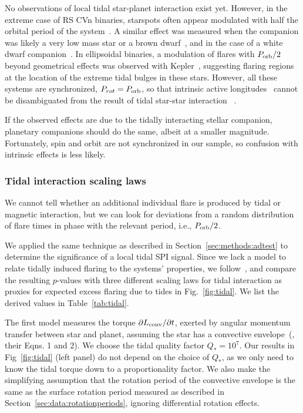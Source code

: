 \documentclass[twocolumn]{aastex631}
\begin{document}
No observations of local tidal star-planet interaction exist yet. However, in the extreme case of RS CVn binaries, starspots often appear modulated with half the orbital period of the system~\citep{olah2002time, ozavci2018recurrent, kriskovics2023ei}. A similar effect was measured when the companion was likely a very low mass star or a brown dwarf~\citep{donati1995activity, frasca2008spots, parks2021interferometric}, and in the case of a white dwarf companion~\citep{hussain2006spot, watson2007roche}. In ellipsoidal binaries, a modulation of flares with $P_{\rm orb}/2$ beyond geometrical effects was observed with Kepler~\citep{gao2016whitelight}, suggesting flaring regions at the location of the extreme tidal bulges in these stars. However, all these systems are synchronized, $P_{rot}=P_{\rm orb}$, so that intrinsic active longitudes~\citep{usoskin2007longterm, weber2013theory, jarvinen2005spots, lanza2009corot} cannot be disambiguated from the result of tidal star-star interaction ~\citep{holzwarth2003dynamics}. 

If the observed effects are due to the tidally interacting stellar companion, planetary companions should do the same, albeit at a smaller magnitude. Fortunately, spin and orbit are not synchronized in our sample, so confusion with intrinsic effects is less likely. 

\subsubsection{Tidal interaction scaling laws}

We cannot tell whether an additional individual flare is produced by tidal or magnetic interaction, but we can look for deviations from a random distribution of flare times in phase with the relevant period, i.e., $P_{\rm orb}/2$. 

We applied the same technique as described in Section~\ref{sec:methods:adtest} to determine the significance of a local tidal SPI signal. Since we lack a model to relate tidally induced flaring to the systems' properties, we follow~\citet{ilic2022tidal}, and compare the resulting $p$-values with three different scaling laws for tidal interaction as proxies for expected excess flaring due to tides in Fig.~\ref{fig:tidal}. We list the derived values in Table~\ref{tab:tidal}. 

The first model measures the torque $\partial L_{\rm conv} / \partial t$, exerted by angular momentum transfer between star and planet, assuming the star has a convective envelope~(\citealt{penev2012constraining}, their Eqns. 1 and 2). We choose the tidal quality factor $Q_*=10^7$. Our results in Fig~\ref{fig:tidal} (left panel) do not depend on the choice of $Q_*$, as we only need to know the tidal torque down to a proportionality factor. We also make the simplifying assumption that the rotation period of the convective envelope is the same as the surface rotation period measured as described in Section~\ref{sec:data:rotationperiods}, ignoring differential rotation effects.
\end{document}
